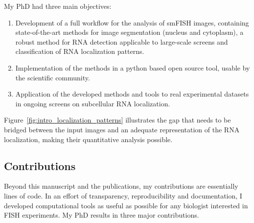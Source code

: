 My PhD had three main objectives:

\begin{enumerate}
\item Development of a full workflow for the analysis of smFISH images, containing state-of-the-art methods for image segmentation (nucleus and cytoplasm), a robust method for RNA detection applicable to large-scale screens and classification of RNA localization patterns. 
\item Implementation of the methods in a python based open source tool, usable by the scientific community. 
\item Application of the developed methods and tools to real experimental datasets in ongoing screens on subcellular RNA localization.
\end{enumerate}

Figure~\ref{fig:intro_localization_patterns} illustrates the gap that needs to be bridged between the input images and an adequate representation of the \ac{RNA} localization, making their quantitative analysis possible.

\subsection{Contributions}
\label{subsec:intro_contributions}

Beyond this manuscript and the publications, my contributions are essentially lines of code.
In an effort of transparency, reproducibility and documentation, I developed computational tools as useful as possible for any biologist interested in \ac{FISH} experiments.
My PhD results in three major contributions.

